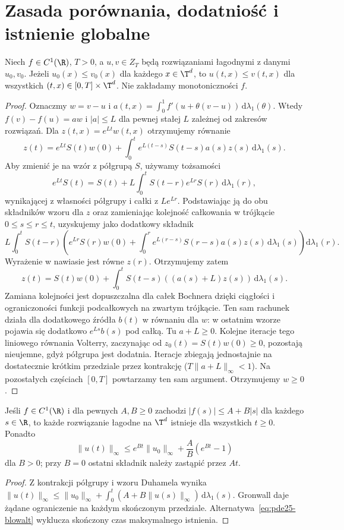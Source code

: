 \section{Zasada porównania, dodatniość i istnienie globalne}
\begin{twierdzenie}
\label{thm:pde25-comparison}
Niech $f\in C^1(\R)$, $T>0$, a $u,v\in Z_T$
będą rozwiązaniami łagodnymi z danymi $u_0,v_0$.
Jeżeli $u_0(x)\le v_0(x)$ dla każdego $x\in\T^d$,
to $u(t,x)\le v(t,x)$ dla wszystkich
$(t,x)\in[0,T]\times\T^d$.
Nie zakładamy monotoniczności $f$.
\end{twierdzenie}
\begin{proof}
Oznaczmy $w=v-u$ i
$a(t,x)=\int_0^1f'(u+\theta(v-u))\,\mathrm d\lambda_1(\theta)$.
Wtedy $f(v)-f(u)=aw$ i $|a|\le L$ dla pewnej
stałej $L$ zależnej od zakresów rozwiązań.
Dla $z(t,x)=e^{Lt}w(t,x)$ otrzymujemy równanie
\[
 z(t)=e^{Lt}S(t)w(0)+
 \int_0^t e^{L(t-s)}S(t-s)a(s)z(s)\,\mathrm d\lambda_1(s).
\]
Aby zmienić je na wzór z półgrupą $S$, używamy
tożsamości
\[
 e^{Lt}S(t)=S(t)+L\int_0^t S(t-r)e^{Lr}S(r)\,
 \mathrm d\lambda_1(r),
\]
wynikającej z własności półgrupy i całki z $Le^{Lr}$.
Podstawiając ją do obu składników wzoru dla $z$
oraz zamieniając kolejność całkowania w trójkącie
$0\le s\le r\le t$, uzyskujemy jako dodatkowy składnik
\[
 L\int_0^t S(t-r)\left(
 e^{Lr}S(r)w(0)+
 \int_0^r e^{L(r-s)}S(r-s)a(s)z(s)\,
                  \mathrm d\lambda_1(s)\right)
                  \mathrm d\lambda_1(r).
\]
Wyrażenie w nawiasie jest równe $z(r)$.
Otrzymujemy zatem
\[
 z(t)=S(t)w(0)+
 \int_0^t S(t-s)((a(s)+L)z(s))\,\mathrm d\lambda_1(s).
\]
Zamiana kolejności jest dopuszczalna dla całek
Bochnera dzięki ciągłości i ograniczoności
funkcji podcałkowych na zwartym trójkącie.
Ten sam rachunek działa dla dodatkowego źródła
$b(t)$ w równaniu dla $w$: w ostatnim wzorze
pojawia się dodatkowo $e^{Ls}b(s)$ pod całką.
Tu $a+L\ge0$. Kolejne iteracje tego liniowego równania
Volterry, zaczynając od $z_0(t)=S(t)w(0)\ge0$, pozostają
nieujemne, gdyż półgrupa jest dodatnia. Iteracje zbiegają
jednostajnie na dostatecznie krótkim przedziale przez
kontrakcję ($T\|a+L\|_\infty<1$). Na pozostałych
częściach $[0,T]$ powtarzamy ten sam argument.
Otrzymujemy $w\ge0$.
\end{proof}

\begin{wniosek}
\label{cor:pde25-global}
Jeśli $f\in C^1(\R)$ i dla pewnych $A,B\ge0$ zachodzi
$|f(s)|\le A+B|s|$ dla każdego $s\in\R$, to każde
rozwiązanie łagodne na $\T^d$ istnieje dla wszystkich
$t\ge0$. Ponadto
\[
 \|u(t)\|_\infty\le
 e^{Bt}\|u_0\|_\infty+\frac AB(e^{Bt}-1)
\]
dla $B>0$; przy $B=0$ ostatni składnik należy zastąpić
przez $At$.
\end{wniosek}
\begin{proof}
Z kontrakcji półgrupy i wzoru Duhamela wynika
$\|u(t)\|_\infty\le\|u_0\|_\infty+
\int_0^t(A+B\|u(s)\|_\infty)\,\mathrm d\lambda_1(s)$.
Gronwall daje żądane ograniczenie na każdym skończonym
przedziale. Alternatywa~\eqref{eq:pde25-blowalt}
wyklucza skończony czas maksymalnego istnienia.
\end{proof}

